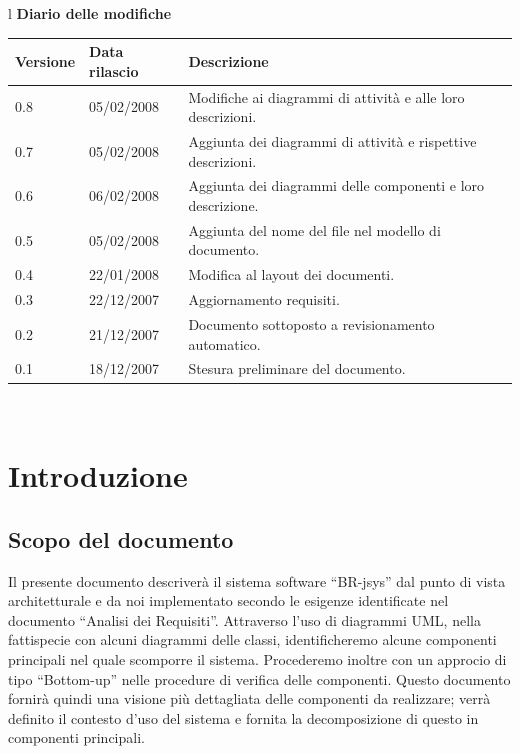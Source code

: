 \documentclass[11pt,titlepage,a4paper]{report}
\begin{document}
\begin{center}
\begin{table}[hbtp]
\large{
\begin{tabular}{l}
\Large{\textbf{\textsf{Diario delle modifiche}}} \\
\begin{tabular}{||p{2cm}||p{3.5cm}||p{6cm}||} \hline
\textbf{Versione} & \textbf{Data rilascio} & \textbf{Descrizione} \\ \hline
0.8 & 05/02/2008 & Modifiche ai diagrammi di attivit\`a e alle loro descrizioni.\\ \hline
0.7 & 05/02/2008 & Aggiunta dei diagrammi di attivit\`a e rispettive descrizioni.\\ \hline
0.6 & 06/02/2008 & Aggiunta dei diagrammi delle componenti e loro descrizione.\\ \hline
0.5 & 05/02/2008 & Aggiunta del nome del file nel modello di documento.\\ \hline
0.4 & 22/01/2008 & Modifica al layout dei documenti.\\ \hline
0.3 & 22/12/2007 & Aggiornamento requisiti. \\ \hline \hline
0.2 & 21/12/2007 & Documento sottoposto a revisionamento automatico.\\ \hline
0.1 & 18/12/2007 & Stesura preliminare del documento. \\ \hline

\end{tabular} \\
\end{tabular}

}
\end{table}
\end{center}
\newpage
\tableofcontents
\chapter{Introduzione}
\section{Scopo del documento}
Il presente documento descriver\`a il sistema software ``BR-jsys'' dal punto di vista architetturale e da noi implementato secondo le esigenze identificate nel documento ``Analisi dei Requisiti''. Attraverso l'uso di diagrammi UML, nella fattispecie con alcuni diagrammi delle classi, identificheremo alcune componenti principali nel quale scomporre il sistema. Procederemo inoltre con un approcio di tipo ``Bottom-up'' nelle procedure di verifica delle componenti. Questo documento fornir\`a quindi una visione pi\`u dettagliata delle componenti da realizzare; verr\`a definito il contesto d'uso del sistema e fornita la decomposizione di questo in componenti principali.
\end{document}
